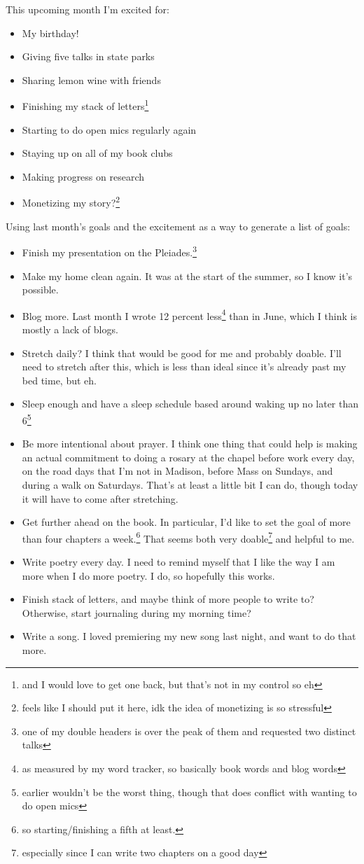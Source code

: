 \documentclass[12pt]{article}[titlepage]
\renewcommand{\,}{\textsuperscript{,}}
\begin{document}
This upcoming month I'm excited for:
\begin{itemize}
\item My birthday!
\item Giving five talks in state parks
\item Sharing lemon wine with friends
\item Finishing my stack of letters\footnote{and I would love to get one back, but that's not in my control so eh}
\item Starting to do open mics regularly again
\item Staying up on all of my book clubs
\item Making progress on research
\item Monetizing my story?\footnote{feels like I should put it here, idk the idea of monetizing is so stressful}
\end{itemize}

Using last month's goals and the excitement as a way to generate a list of goals:
\begin{itemize}
\item Finish my presentation on the Pleiades.\footnote{one of my double headers is over the peak of them and requested two distinct talks}
\item Make my home clean again. It was at the start of the summer, so I know it's possible.
\item Blog more. Last month I wrote 12 percent less\footnote{as measured by my word tracker, so basically book words and blog words} than in June, which I think is mostly a lack of blogs.
\item Stretch daily? I think that would be good for me and probably doable. I'll need to stretch after this, which is less than ideal since it's already past my bed time, but eh.
\item Sleep enough and have a sleep schedule based around waking up no later than 6\footnote{earlier wouldn't be the worst thing, though that does conflict with wanting to do open mics}
\item Be more intentional about prayer.
I think one thing that could help is making an actual commitment to doing a rosary at the chapel before work every day, on the road days that I'm not in Madison, before Mass on Sundays, and during a walk on Saturdays.
That's at least a little bit I can do, though today it will have to come after stretching.
\item Get further ahead on the book.
In particular, I'd like to set the goal of more than four chapters a week.\footnote{so starting/finishing a fifth at least.}
That seems both very doable\footnote{especially since I can write two chapters on a good day} and helpful to me.
\item Write poetry every day.
I need to remind myself that I like the way I am more when I do more poetry.
I do, so hopefully this works.
\item Finish stack of letters, and maybe think of more people to write to? Otherwise, start journaling during my morning time?
\item Write a song. I loved premiering my new song last night, and want to do that more.
\end{itemize}
\end{document}
